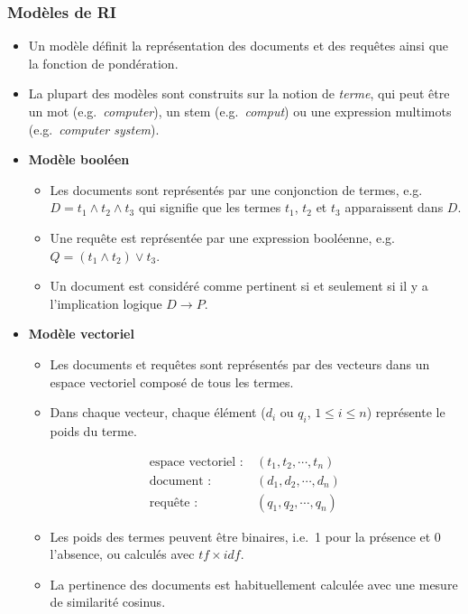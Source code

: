 \documentclass[12pt,aspectratio=43,dvipsnames,table]{beamer}
\begin{document}
\begin{frame}[allowframebreaks]
    \frametitle{Modèles de RI}
    \begin{itemize} \itemsep10pt
        \item Un modèle définit la représentation des documents et des requêtes 
              ainsi que la fonction de pondération.
        \item La plupart des modèles sont construits sur la notion de 
              \textit{terme}, qui peut être un mot (e.g.~\textit{computer}), un 
              stem (e.g.~\textit{comput}) ou une expression multimots 
              (e.g.~\textit{computer system}).
        \item \textbf{Modèle booléen}
        \begin{itemize}
            \item Les documents sont représentés par une conjonction de termes, 
                  e.g.~$D = t_1 \land t_2 \land t_3$ qui signifie que les termes
                  $t_1$, $t_2$ et $t_3$ apparaissent dans $D$.
            \item Une requête est représentée par une expression booléenne, 
                  e.g.~$Q = (t_1 \land t_2) \lor t_3$.
            \item Un document est considéré comme pertinent si et seulement si 
                  il y a l'implication logique $D \to P$.
        \end{itemize}

        \framebreak

        \item \textbf{Modèle vectoriel}~\cite{DBLP:journals/cacm/SaltonWY75,DBLP:books/mg/SaltonG83}
        \begin{itemize}
            \item Les documents et requêtes sont représentés par des vecteurs 
                  dans un espace vectoriel composé de tous les termes.
            \item Dans chaque vecteur, chaque élément ($d_i$ ou $q_i$, 
                  $1 \leq i \leq n$) représente le poids du terme.
        \end{itemize}
        \vspace*{-0.5em}
        \begin{align*}
          \text{espace vectoriel~:} &~(t_1, t_2, \cdots, t_n) \\
          \text{document~:} &~(d_1, d_2, \cdots, d_n) \\
          \text{requête~:} &~(q_1, q_2, \cdots, q_n)
        \end{align*}
        \vspace*{-1.5em}
        \begin{itemize}
            \item Les poids des termes peuvent être binaires, i.e.~1 pour la 
                  présence et 0 l'absence, ou calculés avec $tf \times idf$.
            \item La pertinence des documents est habituellement calculée avec 
                  une mesure de similarité cosinus.
        \end{itemize}


\end{itemize}
\end{frame}
\end{document}
